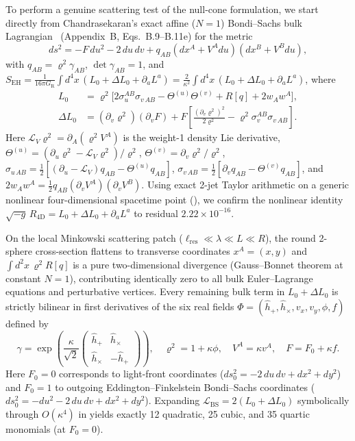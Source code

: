 \documentclass[11pt]{article}
\begin{document}
To perform a genuine scattering test of the null-cone formulation, we start directly from Chandrasekaran's exact affine ($N=1$) Bondi--Sachs bulk Lagrangian~\cite{Chandrasekaran2026} (Appendix~B, Eqs.~B.9--B.11e) for the metric
\begin{equation}\label{eq:bs_metric}
ds^2 = -F\,du^2 - 2\,du\,dv + q_{AB}(dx^A + V^A du)(dx^B + V^B du),
\end{equation}
with $q_{AB} = \varrho^2\gamma_{AB}$, $\det\gamma_{AB} = 1$, and $S_{\mathrm{EH}} = \frac{1}{16\pi G_{\mathrm{R}}}\int d^4x\,(L_0 + \Delta L_0 + \partial_a L^a) = \frac{2}{\kappa^2}\int d^4x\,(L_0 + \Delta L_0 + \partial_a L^a)$, where
\begin{align}
L_0 &= \varrho^2\big[2\sigma_u^{AB}\sigma_{v\,AB} - \Theta^{(u)}\Theta^{(v)} + R[q] + 2 w_A w^A\big], \label{eq:L0}\\
\Delta L_0 &= (\partial_v\varrho^2)(\partial_v F) + F\!\left[\frac{(\partial_v\varrho^2)^2}{2\varrho^2} - \varrho^2\sigma_v^{AB}\sigma_{v\,AB}\right]. \label{eq:dL0}
\end{align}
Here $\mathcal{L}_V\varrho^2 = \partial_A(\varrho^2 V^A)$ is the weight-1 density Lie derivative, $\Theta^{(u)} = (\partial_u\varrho^2 - \mathcal{L}_V\varrho^2)/\varrho^2$, $\Theta^{(v)} = \partial_v\varrho^2/\varrho^2$, $\sigma_{u\,AB} = \frac{1}{2}[(\partial_u - \mathcal{L}_V)q_{AB} - \Theta^{(u)}q_{AB}]$, $\sigma_{v\,AB} = \frac{1}{2}[\partial_v q_{AB} - \Theta^{(v)}q_{AB}]$, and $2w_A w^A = \frac{1}{2}q_{AB}(\partial_v V^A)(\partial_v V^B)$. Using exact 2-jet Taylor arithmetic on a generic nonlinear four-dimensional spacetime point (), we confirm the nonlinear identity $\sqrt{-g}\,R_{4\mathrm{D}} = L_0 + \Delta L_0 + \partial_a L^a$ to residual $2.22\times 10^{-16}$.

On the local Minkowski scattering patch ($\ell_{\mathrm{res}} \ll \lambda \ll L \ll R$), the round 2-sphere cross-section flattens to transverse coordinates $x^A = (x, y)$ and $\int d^2x\,\varrho^2 R[q]$ is a pure two-dimensional divergence (Gauss--Bonnet theorem at constant $N=1$), contributing identically zero to all bulk Euler--Lagrange equations and perturbative vertices. Every remaining bulk term in $L_0 + \Delta L_0$ is strictly bilinear in first derivatives of the six real fields $\Phi = (\hat h_+, \hat h_\times, v_x, v_y, \phi, f)$ defined by
\begin{equation}\label{eq:bs_expand}
\gamma = \exp\!\left(\frac{\kappa}{\sqrt{2}}\begin{pmatrix}\hat h_+ & \hat h_\times \\ \hat h_\times & -\hat h_+\end{pmatrix}\right), \quad
\varrho^2 = 1 + \kappa\phi, \quad V^A = \kappa v^A, \quad F = F_0 + \kappa f.
\end{equation}
Here $F_0 = 0$ corresponds to light-front coordinates ($ds_0^2 = -2\,du\,dv + dx^2 + dy^2$) and $F_0 = 1$ to outgoing Eddington--Finkelstein Bondi--Sachs coordinates ($ds_0^2 = -du^2 - 2\,du\,dv + dx^2 + dy^2$). Expanding $\mathcal{L}_{\mathrm{BS}} = 2(L_0 + \Delta L_0)$ symbolically through $O(\kappa^4)$ in  yields exactly 12 quadratic, 25 cubic, and 35 quartic monomials (at $F_0 = 0$).
\end{document}
